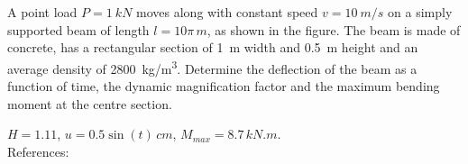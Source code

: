 
\begin{Exercise}[label={moving_load}]
A point load $P=\SI{1}{kN}$ moves along with constant speed $v=\SI{10}{m/s}$ on a simply supported beam of length $l=10\pi\,\si{m}$, as shown in the figure. The beam is made of concrete, has a rectangular section of \SI{1}{m} width and \SI{0.5}{m} height and an average density of \SI{2800}{kg/m^3}. Determine the deflection of the beam as a function of time, the dynamic magnification factor and the maximum bending moment at the centre section.

\begin{center}
\end{center}

\shortAnswer $H=1.11$, $u=0.5\sin(t)\,\si{cm}$, $M_{max} = 8.7\,\si{kN.m}$. \\
References: \cite[p. 305]{chopra}
\end{Exercise}



